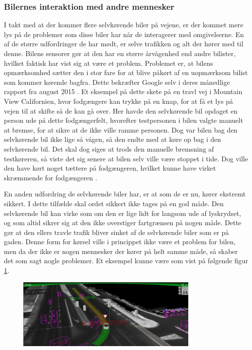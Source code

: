 \subsubsection{Bilernes interaktion med andre mennesker}
\label{interaktion}

I takt med at der kommer flere selvkørende biler på vejene, er der kommet mere lys på de problemer som disse biler har når de interagerer med omgivelserne. En af de større udfordringer de har mødt, er selve trafikken og alt der hører med til denne. Bilens sensorer gør at den har en større årvågenhed end andre bilister, hvilket faktisk har vist sig at være et problem. Problemet er, at bilens opmærksomhed sætter den i stor fare for at blive påkørt af en uopmærksom bilist som kommer kørende bagfra. Dette bekræfter Google selv i deres månedlige rapport fra august 2015 \cite{GOOG_MONTHLY}. Et eksempel på dette skete på en travl vej i Mountain View Californien, hvor fodgængere kan trykke på en knap, for at få et lys på vejen til at skifte så de kan gå over. Her havde den selvkørende bil opdaget en person ude på dette fodgængerfelt, hvorefter testpersonen i bilen valgte manuelt at bremse, for at sikre at de ikke ville ramme personen. Dog var bilen bag den selvkørende bil ikke lige så vågen, så den endte med at køre op bag i den selvkørende bil. Det skal dog siges at trods den manuelle bremsning af testkøreren, så viste det sig senere at bilen selv ville være stoppet i tide. Dog ville den have kørt noget tættere på fodgængeren, hvilket kunne have virket skræmmende for fodgængeren \cite{GOOG_MONTHLY}. 

En anden udfordring de selvkørende biler har, er at som de er nu, kører ekstremt sikkert. I dette tilfælde skal ordet sikkert ikke tages på en god måde. Den selvkørende bil kan virke som om den er lige lidt for langsom ude af lyskrydset, og som altid sikrer sig at den ikke overstiger fartgrænsen på nogen måde. Dette gør at den ellers travle trafik bliver sinket af de selvkørende biler som er på gaden. Denne form for kørsel ville i princippet ikke være et problem for bilen, men da der ikke er nogen mennesker der kører på helt samme måde, så skaber det som sagt nogle problemer. Et eksempel kunne være som vist på følgende figur \ref{fig:car_vision}.

\begin{figure}[h!]
    \centering
    \includegraphics[width=0.8\textwidth]{images/google_vision.png}
    \label{fig:car_vision}
\end{figure}

